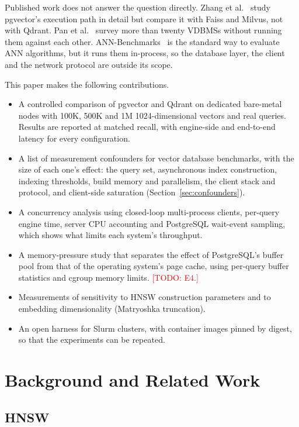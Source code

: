 \documentclass[sigconf, nonacm]{acmart}
\newcommand{\todo}[1]{\textcolor{red}{[TODO: #1]}}
\newcommand{\todo}[1]{\errmessage{Unresolved TODO: #1}}
\begin{document}
Published work does not answer the question directly. Zhang et al.~\cite{zhang2024}
study pgvector's execution path in detail but compare it with Faiss and Milvus, not with
Qdrant. Pan et al.~\cite{pan2024survey} survey more than twenty VDBMSs without running
them against each other. ANN-Benchmarks~\cite{aumuller2020} is the standard way to
evaluate ANN algorithms, but it runs them in-process, so the database layer, the client
and the network protocol are outside its scope.

This paper makes the following contributions.
\begin{itemize}
  \item A controlled comparison of pgvector and Qdrant on dedicated bare-metal nodes
    with 100K, 500K and 1M 1024-dimensional vectors and real queries. Results are
    reported at matched recall, with engine-side and end-to-end latency for every
    configuration.
  \item A list of measurement confounders for vector database benchmarks, with the
    size of each one's effect: the query set, asynchronous index construction,
    indexing thresholds, build memory and parallelism, the client stack and protocol,
    and client-side saturation (Section~\ref{sec:confounders}).
  \item A concurrency analysis using closed-loop multi-process clients, per-query engine
    time, server CPU accounting and PostgreSQL wait-event sampling, which shows what
    limits each system's throughput.
  \item A memory-pressure study that separates the effect of PostgreSQL's buffer pool
    from that of the operating system's page cache, using per-query buffer statistics
    and cgroup memory limits. \todo{E4.}
  \item Measurements of sensitivity to HNSW construction parameters and to embedding
    dimensionality (Matryoshka truncation).
  \item An open harness for Slurm clusters, with container images pinned by digest, so
    that the experiments can be repeated.
\end{itemize}

\section{Background and Related Work}

\subsection{HNSW}
\end{document}
